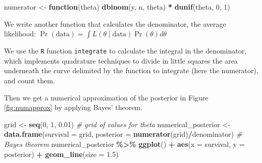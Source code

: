 \documentclass[
  12pt,
]{krantz}
\newenvironment{Shaded}{\begin{snugshade}}{\end{snugshade}}
\newcommand{\AttributeTok}[1]{\textcolor[rgb]{0.13,0.29,0.53}{#1}}
\newcommand{\CommentTok}[1]{\textcolor[rgb]{0.56,0.35,0.01}{\textit{#1}}}
\newcommand{\ControlFlowTok}[1]{\textcolor[rgb]{0.13,0.29,0.53}{\textbf{#1}}}
\newcommand{\DecValTok}[1]{\textcolor[rgb]{0.00,0.00,0.81}{#1}}
\newcommand{\FloatTok}[1]{\textcolor[rgb]{0.00,0.00,0.81}{#1}}
\newcommand{\FunctionTok}[1]{\textcolor[rgb]{0.13,0.29,0.53}{\textbf{#1}}}
\newcommand{\NormalTok}[1]{#1}
\newcommand{\OtherTok}[1]{\textcolor[rgb]{0.56,0.35,0.01}{#1}}
\newcommand{\SpecialCharTok}[1]{\textcolor[rgb]{0.81,0.36,0.00}{\textbf{#1}}}
\begin{document}
\begin{Shaded}
\begin{Highlighting}[]
\NormalTok{numerator }\OtherTok{\textless{}{-}} \ControlFlowTok{function}\NormalTok{(theta) }\FunctionTok{dbinom}\NormalTok{(y, n, theta) }\SpecialCharTok{*} \FunctionTok{dunif}\NormalTok{(theta, }\DecValTok{0}\NormalTok{, }\DecValTok{1}\NormalTok{)}
\end{Highlighting}
\end{Shaded}

We write another function that calculates the denominator, the average likelihood: \(\Pr(\text{data}) = \int{L(\theta \mid \text{data}) \Pr(\theta) d\theta}\)

\begin{Shaded}
\end{Shaded}

We use the \texttt{R} function \texttt{integrate} to calculate the integral in the denominator, which implements quadrature techniques to divide in little squares the area underneath the curve delimited by the function to integrate (here the numerator), and count them.

Then we get a numerical approximation of the posterior in Figure \ref{fig:numapprox} by applying Bayes' theorem.

\begin{Shaded}
\begin{Highlighting}[]
\NormalTok{grid }\OtherTok{\textless{}{-}} \FunctionTok{seq}\NormalTok{(}\DecValTok{0}\NormalTok{, }\DecValTok{1}\NormalTok{, }\FloatTok{0.01}\NormalTok{) }\CommentTok{\# grid of values for theta}
\NormalTok{numerical\_posterior }\OtherTok{\textless{}{-}} \FunctionTok{data.frame}\NormalTok{(}\AttributeTok{survival =}\NormalTok{ grid, }
                                  \AttributeTok{posterior =} \FunctionTok{numerator}\NormalTok{(grid)}\SpecialCharTok{/}\NormalTok{denominator) }\CommentTok{\# Bayes\textquotesingle{} theorem}
\NormalTok{numerical\_posterior }\SpecialCharTok{\%\textgreater{}\%}
  \FunctionTok{ggplot}\NormalTok{() }\SpecialCharTok{+}
  \FunctionTok{aes}\NormalTok{(}\AttributeTok{x =}\NormalTok{ survival, }\AttributeTok{y =}\NormalTok{ posterior) }\SpecialCharTok{+} 
  \FunctionTok{geom\_line}\NormalTok{(}\AttributeTok{size =} \FloatTok{1.5}\NormalTok{)}
\end{Highlighting}
\end{Shaded}
\end{document}
